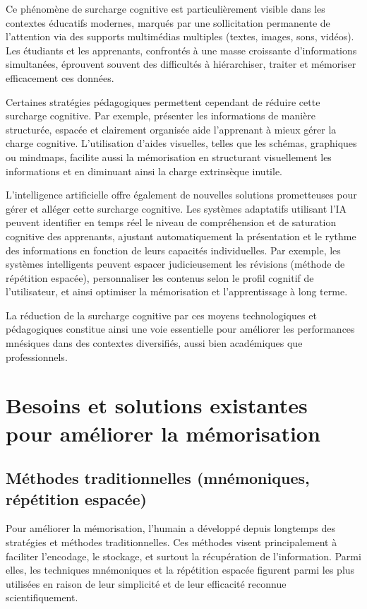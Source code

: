 \documentclass[11pt,a4paper]{report}
\begin{document}
Ce phénomène de surcharge cognitive est particulièrement visible dans les contextes éducatifs modernes, marqués par une sollicitation permanente de l'attention via des supports multimédias multiples (textes, images, sons, vidéos). Les étudiants et les apprenants, confrontés à une masse croissante d’informations simultanées, éprouvent souvent des difficultés à hiérarchiser, traiter et mémoriser efficacement ces données.

Certaines stratégies pédagogiques permettent cependant de réduire cette surcharge cognitive. Par exemple, présenter les informations de manière structurée, espacée et clairement organisée aide l’apprenant à mieux gérer la charge cognitive. L'utilisation d’aides visuelles, telles que les schémas, graphiques ou mindmaps, facilite aussi la mémorisation en structurant visuellement les informations et en diminuant ainsi la charge extrinsèque inutile.

L’intelligence artificielle offre également de nouvelles solutions prometteuses pour gérer et alléger cette surcharge cognitive. Les systèmes adaptatifs utilisant l'IA peuvent identifier en temps réel le niveau de compréhension et de saturation cognitive des apprenants, ajustant automatiquement la présentation et le rythme des informations en fonction de leurs capacités individuelles. Par exemple, les systèmes intelligents peuvent espacer judicieusement les révisions (méthode de répétition espacée), personnaliser les contenus selon le profil cognitif de l’utilisateur, et ainsi optimiser la mémorisation et l'apprentissage à long terme.

La réduction de la surcharge cognitive par ces moyens technologiques et pédagogiques constitue ainsi une voie essentielle pour améliorer les performances mnésiques dans des contextes diversifiés, aussi bien académiques que professionnels.

\section{Besoins et solutions existantes pour améliorer la mémorisation}

\subsection{Méthodes traditionnelles (mnémoniques, répétition espacée)}

Pour améliorer la mémorisation, l’humain a développé depuis longtemps des stratégies et méthodes traditionnelles. Ces méthodes visent principalement à faciliter l’encodage, le stockage, et surtout la récupération de l’information. Parmi elles, les techniques mnémoniques et la répétition espacée figurent parmi les plus utilisées en raison de leur simplicité et de leur efficacité reconnue scientifiquement.
\end{document}
